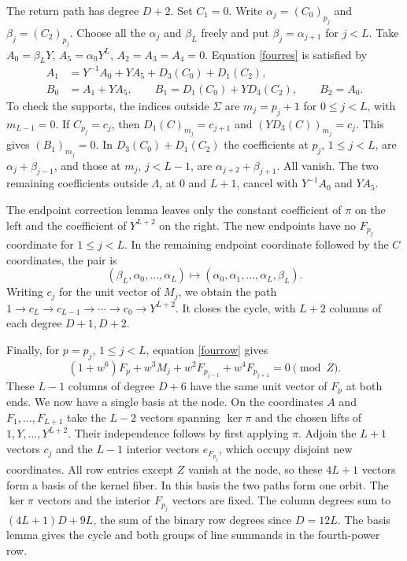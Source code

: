 \documentclass[11pt,a4paper,reqno]{amsart}
\numberwithin{equation}{section}
\theoremstyle{plain}
\begin{document}
The return path has degree $D+2$. Set $C_1=0$. Write $\alpha_j=(C_0)_{p_j}$ and $\beta_j=(C_2)_{p_j}$. Choose all the $\alpha_j$ and $\beta_L$ freely and put $\beta_j=\alpha_{j+1}$ for $j<L$. Take $A_0=\beta_LY$, $A_5=\alpha_0Y^L$, $A_2=A_3=A_4=0$. Equation \eqref{fourres} is satisfied by
\begin{align*}
 A_1&=Y^{-1}A_0+YA_5+D_3(C_0)+D_1(C_2),\\
 B_0&=A_1+YA_5,\qquad B_1=D_1(C_0)+YD_3(C_2),\qquad B_2=A_0 .
\end{align*}
To check the supports, the indices outside $\Sigma$ are $m_j=p_j+1$ for $0\le j<L$, with $m_{L-1}=0$. If $C_{p_j}=c_j$, then $D_1(C)_{m_j}=c_{j+1}$ and $(YD_3(C))_{m_j}=c_j$. This gives $(B_1)_{m_j}=0$. In $D_3(C_0)+D_1(C_2)$ the coefficients at $p_j$, $1\le j<L$, are $\alpha_j+\beta_{j-1}$, and those at $m_j$, $j<L-1$, are $\alpha_{j+2}+\beta_{j+1}$. All vanish. The two remaining coefficients outside $\Lambda$, at $0$ and $L+1$, cancel with $Y^{-1}A_0$ and $YA_5$.

The endpoint correction lemma leaves only the constant coefficient of $\pi$ on the left and the coefficient of $Y^{L+2}$ on the right. The new endpoints have no $F_{p_j}$ coordinate for $1\le j<L$. In the remaining endpoint coordinate followed by the $C$ coordinates, the pair is
\[
 (\beta_L,\alpha_0,\ldots,\alpha_L)\longmapsto
               (\alpha_0,\alpha_1,\ldots,\alpha_L,\beta_L).
\]
Writing $c_j$ for the unit vector of $M_j$, we obtain the path
$1\to c_L\to c_{L-1}\to\cdots\to c_0\to Y^{L+2}$. It closes the cycle, with $L+2$ columns of each degree $D+1,D+2$.

Finally, for $p=p_j$, $1\le j<L$, equation \eqref{fourrow} gives
\[
 (1+w^6)F_p+w^3 M_j+w^2F_{p_{j-1}}+w^4F_{p_{j+1}}=0\pmod Z .
\]
These $L-1$ columns of degree $D+6$ have the same unit vector of $F_p$ at both ends. We now have a single basis at the node. On the coordinates $A$ and $F_1,\ldots,F_{L+1}$ take the $L-2$ vectors spanning $\ker\pi$ and the chosen lifts of $1,Y,\ldots,Y^{L+2}$. Their independence follows by first applying $\pi$. Adjoin the $L+1$ vectors $c_j$ and the $L-1$ interior vectors $e_{F_{p_j}}$, which occupy disjoint new coordinates. All row entries except $Z$ vanish at the node, so these $4L+1$ vectors form a basis of the kernel fiber. In this basis the two paths form one orbit. The $\ker\pi$ vectors and the interior $F_{p_j}$ vectors are fixed. The column degrees sum to $(4L+1)D+9L$, the sum of the binary row degrees since $D=12L$. The basis lemma gives the cycle and both groups of line summands in the fourth-power row.
\end{document}

